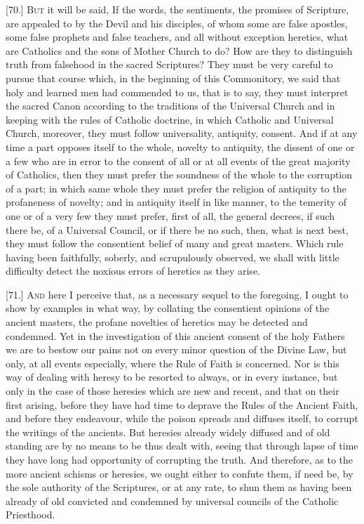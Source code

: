 [70.] \textsc{But} it will be said, If the words, the sentiments, the promises of Scripture, are appealed to by the Devil and his disciples, of whom some are false apostles, some false prophets and false teachers, and all without exception heretics, what are Catholics and the sons of Mother Church to do? How are they to distinguish truth from falsehood in the sacred Scriptures? They must be very careful to pursue that course which, in the beginning of this Commonitory, we said that holy and learned men had commended to us, that is to say, they must interpret the sacred Canon according to the traditions of the Universal Church and in keeping with the rules of Catholic doctrine, in which Catholic and Universal Church, moreover, they must follow universality, antiquity, consent. And if at any time a part opposes itself to the whole, novelty to antiquity, the dissent of one or a few who are in error to the consent of all or at all events of the great majority of Catholics, then they must prefer the soundness of the whole to the corruption of a part; in which same whole they must prefer the religion of antiquity to the profaneness of novelty; and in antiquity itself in like manner, to the temerity of one or of a very few they must prefer, first of all, the general decrees, if such there be, of a Universal Council, or if there be no such, then, what is next best, they must follow the consentient belief of many and great masters. Which rule having been faithfully, soberly, and scrupulously observed, we shall with little difficulty detect the noxious errors of heretics as they arise.


[71.] \textsc{And} here I perceive that, as a necessary sequel to the foregoing, I ought to show by examples in what way, by collating the consentient opinions of the ancient masters, the profane novelties of heretics may be detected and condemned. Yet in the investigation of this ancient consent of the holy Fathers we are to bestow our pains not on every minor question of the Divine Law, but only, at all events especially, where the Rule of Faith is concerned. Nor is this way of dealing with heresy to be resorted to always, or in every instance, but only in the case of those heresies which are new and recent, and that on their first arising, before they have had time to deprave the Rules of the Ancient Faith, and before they endeavour, while the poison spreads and diffuses itself, to corrupt the writings of the ancients. But heresies already widely diffused and of old standing are by no means to be thus dealt with, seeing that through lapse of time they have long had opportunity of corrupting the truth. And therefore, as to the more ancient schisms or heresies, we ought either to confute them, if need be, by the sole authority of the Scriptures, or at any rate, to shun them as having been already of old convicted and condemned by universal councils of the Catholic Priesthood.

